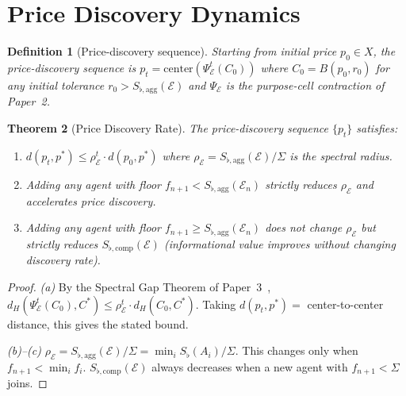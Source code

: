 \documentclass[twocolumn,11pt,a4paper]{article}
\newtheorem{theorem}{Theorem}[section]
\newtheorem{definition}[theorem]{Definition}
\theoremstyle{remark}
\newcommand{\Sflat}{S_{\flat}}
\newcommand{\Ens}{\mathcal{E}}
\newcommand{\MidP}{p^*}                  %
\newcommand{\SflatT}{S_{\flat,\mathrm{agg}}}        %
\newcommand{\SflatI}{S_{\flat,\mathrm{comp}}}       %
\newcommand{\srad}{\rho}               %
\begin{document}
\section{Price Discovery Dynamics}
\label{sec:discovery}

\begin{definition}[Price-discovery sequence]
\label{def:pd-seq}
Starting from initial price $p_0 \in X$, the \emph{price-discovery sequence}
is $p_t = \mathrm{center}(\Psi_\Ens^t(C_0))$ where $C_0 = B(p_0, r_0)$ for
any initial tolerance $r_0 > \SflatT(\Ens)$ and $\Psi_\Ens$ is the
purpose-cell contraction of Paper~2.
\end{definition}

\begin{theorem}[Price Discovery Rate]
\label{thm:discovery-rate}
The price-discovery sequence $\{p_t\}$ satisfies:
\begin{enumerate}[label=\textup{(\alph*)}]
\item $d(p_t, \MidP) \le \srad_\Ens^t \cdot d(p_0, \MidP)$ where
  $\srad_\Ens = \SflatT(\Ens)/\Sigma$ is the spectral radius.
\item Adding any agent with floor $f_{n+1} < \SflatT(\Ens_n)$ strictly
  reduces $\srad_\Ens$ and accelerates price discovery.
\item Adding any agent with floor $f_{n+1} \ge \SflatT(\Ens_n)$ does not
  change $\srad_\Ens$ but strictly reduces $\SflatI(\Ens)$ (informational
  value improves without changing discovery rate).
\end{enumerate}
\end{theorem}
\begin{proof}
\textit{(a)}  By the Spectral Gap Theorem of Paper~3~\cite{sachikonye2025het},
$d_H(\Psi_\Ens^t(C_0), C^*) \le \srad_\Ens^t \cdot d_H(C_0, C^*)$.
Taking $d(p_t, \MidP) = $ center-to-center distance, this gives the stated
bound.

\textit{(b)--(c)}  $\srad_\Ens = \SflatT(\Ens)/\Sigma = \min_i\Sflat(A_i)/\Sigma$.
This changes only when $f_{n+1} < \min_i f_i$.  $\SflatI(\Ens)$ always
decreases when a new agent with $f_{n+1} < \Sigma$ joins.
\end{proof}
\end{document}
